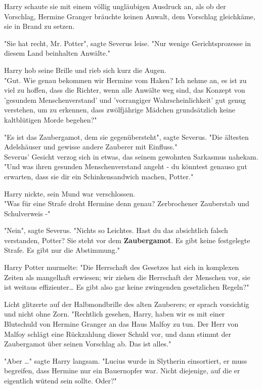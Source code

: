 {Harry schaute sie mit einem völlig ungläubigen Ausdruck an, als ob der Vorschlag, Hermine Granger bräuchte keinen Anwalt, dem Vorschlag gleichkäme, sie in Brand zu setzen.

"Sie hat recht, Mr. Potter", sagte Severus leise. "Nur wenige Gerichtsprozesse in diesem Land beinhalten Anwälte."

Harry hob seine Brille und rieb sich kurz die Augen.\\ "Gut. Wie genau bekommen wir Hermine vom Haken? Ich nehme an, es ist zu viel zu hoffen, dass die Richter, wenn alle Anwälte weg sind, das Konzept von 'gesundem Menschenverstand' und 'vorrangiger Wahrscheinlichkeit' gut genug verstehen, um zu erkennen, dass zwölfjährige Mädchen grundsätzlich keine kaltblütigen Morde begehen?"

"Es ist das Zaubergamot, dem sie gegenübersteht", sagte Severus. "Die ältesten Adelshäuser und gewisse andere Zauberer mit Einfluss."\\ Severus' Gesicht verzog sich in etwas, das seinem gewohnten Sarkasmus nahekam. "Und was ihren gesunden Menschenverstand angeht - du könntest genauso gut erwarten, dass sie dir ein Schinkensandwich machen, Potter."

Harry nickte, sein Mund war verschlossen.\\ "Was für eine Strafe droht Hermine denn genau? Zerbrochener Zauberstab und Schulverweis -"

"Nein", sagte Severus. "Nichts so Leichtes. Hast du das absichtlich falsch verstanden, Potter? Sie steht vor dem \textbf{Zaubergamot}. Es gibt keine festgelegte Strafe. Es gibt nur die Abstimmung."

Harry Potter murmelte: "Die Herrschaft des Gesetzes hat sich in komplexen Zeiten als mangelhaft erwiesen; wir ziehen die Herrschaft der Menschen vor, sie ist weitaus effizienter… Es gibt also gar keine zwingenden gesetzlichen Regeln?"

Licht glitzerte auf der Halbmondbrille des alten Zauberers; er sprach vorsichtig und nicht ohne Zorn. "Rechtlich gesehen, Harry, haben wir es mit einer Blutschuld von Hermine Granger an das Haus Malfoy zu tun. Der Herr von Malfoy schlägt eine Rückzahlung dieser Schuld vor, und dann stimmt der Zaubergamot über seinen Vorschlag ab. Das ist alles."

"Aber …" sagte Harry langsam. "Lucius wurde in Slytherin einsortiert, er muss begreifen, dass Hermine nur ein Bauernopfer war. Nicht diejenige, auf die er eigentlich wütend sein sollte. Oder?"

}
